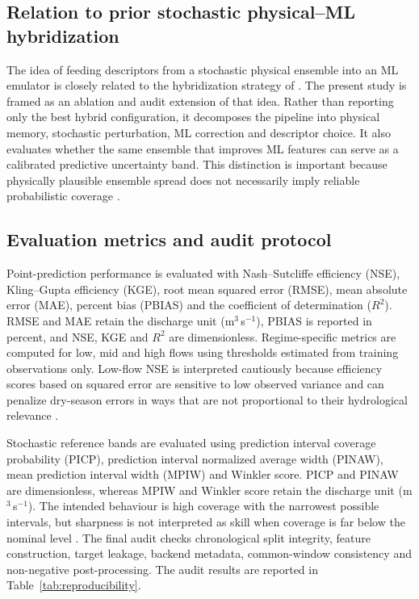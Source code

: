 \documentclass[a4paper,fleqn]{cas-sc}
\newcommand{\cms}{m$^3$\,s$^{-1}$}
\begin{document}
\subsection{Relation to prior stochastic physical--ML hybridization}
\label{subsec:relation}

The idea of feeding descriptors from a stochastic physical ensemble into
an ML emulator is closely related to the hybridization strategy of
\citet{houenafa2025hybridization}. The present study is framed as an
ablation and audit extension of that idea. Rather than reporting only
the best hybrid configuration, it decomposes the pipeline into physical
memory, stochastic perturbation, ML correction and descriptor choice. It
also evaluates whether the same ensemble that improves ML features can
serve as a calibrated predictive uncertainty band. This distinction is
important because physically plausible ensemble spread does not
necessarily imply reliable probabilistic coverage
\citep{atger1999skill,franz2011evaluating,papacharalampous2022review}.

\subsection{Evaluation metrics and audit protocol}\label{subsec:evaluation}

Point-prediction performance is evaluated with Nash--Sutcliffe
efficiency (NSE), Kling--Gupta efficiency (KGE), root mean squared error
(RMSE), mean absolute error (MAE), percent bias (PBIAS) and the
coefficient of determination ($R^2$). RMSE and MAE retain the discharge unit (\cms),
PBIAS is reported in percent, and NSE, KGE and $R^2$ are dimensionless. Regime-specific metrics are
computed for low, mid and high flows using thresholds estimated from
training observations only. Low-flow NSE is interpreted cautiously
because efficiency scores based on squared error are sensitive to low
observed variance and can penalize dry-season errors in ways that are
not proportional to their hydrological relevance
\citep{pushpalatha2012review}.

Stochastic reference bands are evaluated using prediction interval
coverage probability (PICP), prediction interval normalized average
width (PINAW), mean prediction interval width (MPIW) and Winkler score.
PICP and PINAW are dimensionless, whereas MPIW and Winkler score retain
the discharge unit (\cms).
The intended behaviour is high coverage with the narrowest possible
intervals, but sharpness is not interpreted as skill when coverage is
far below the nominal level \citep{franz2011evaluating,abaza2017incidence,papacharalampous2022review}.
The final audit checks chronological split integrity, feature
construction, target leakage, backend metadata, common-window
consistency and non-negative post-processing. The audit results are
reported in Table~\ref{tab:reproducibility}.
\end{document}
